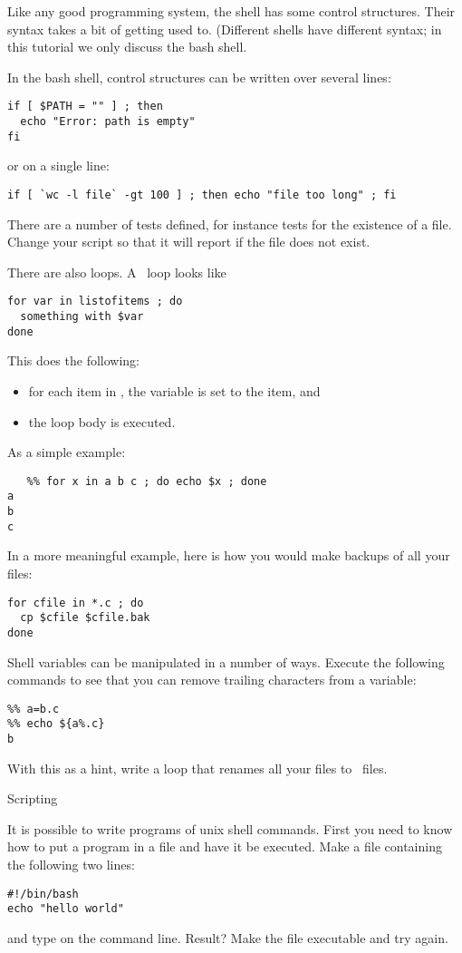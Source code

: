 Like any good programming system, the shell has some control
structures. Their syntax takes a bit of getting used to. (Different
shells have different syntax; in this tutorial we only discuss the
bash shell.

In the bash shell, control structures can be written over several
lines:
\begin{verbatim}
if [ $PATH = "" ] ; then
  echo "Error: path is empty"
fi
\end{verbatim}
or on a single line:
\begin{verbatim}
if [ `wc -l file` -gt 100 ] ; then echo "file too long" ; fi
\end{verbatim}
There are a number of tests defined, for instance 
tests for the existence of a file. Change your script so that it will
report  if the file does not exist.

There are also loops. A~ loop looks like
\begin{verbatim}
for var in listofitems ; do
  something with $var
done
\end{verbatim}
This does the following:
\begin{itemize}
\item for each item in , the variable  is set to the
  item, and
\item the loop body is executed.
\end{itemize}
As a simple example:
\begin{verbatim}
   %% for x in a b c ; do echo $x ; done
a
b
c
\end{verbatim}
In a more meaningful example,
here is how you would make backups of all your~
files:
\begin{verbatim}
for cfile in *.c ; do
  cp $cfile $cfile.bak
done
\end{verbatim}
Shell variables can be manipulated in a number of ways.
Execute the following commands to see that you can remove trailing
characters from a variable:
\begin{verbatim}
%% a=b.c
%% echo ${a%.c}
b
\end{verbatim}
With this as a hint, write a loop that renames all your  files
to~ files.

 {Scripting}
\label{sec:shell-scripting}

It is possible to write programs of unix shell commands. First you
need to know how to put a program in a file and have it be
executed. Make a file  containing the following two lines:
\begin{verbatim}
#!/bin/bash
echo "hello world"
\end{verbatim}
and type  on the command line. Result?
Make the file executable and try again.

